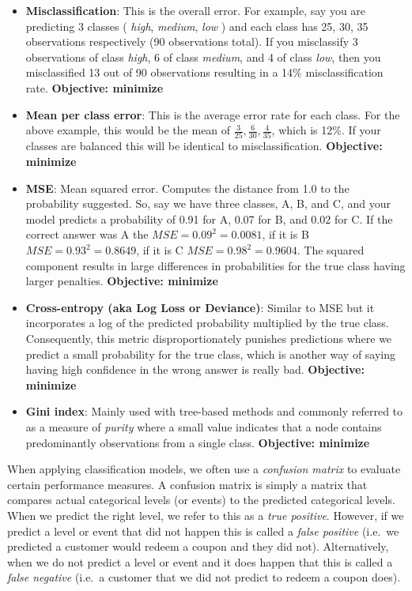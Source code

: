 \documentclass[]{krantz}
\begin{document}
\begin{itemize}
\item
  \textbf{Misclassification}: This is the overall error. For example, say you are predicting 3 classes ( \emph{high}, \emph{medium}, \emph{low} ) and each class has 25, 30, 35 observations respectively (90 observations total). If you misclassify 3 observations of class \emph{high}, 6 of class \emph{medium}, and 4 of class \emph{low}, then you misclassified 13 out of 90 observations resulting in a 14\% misclassification rate. \textbf{Objective: minimize}
\item
  \textbf{Mean per class error}: This is the average error rate for each class. For the above example, this would be the mean of \(\frac{3}{25}, \frac{6}{30}, \frac{4}{35}\), which is 12\%. If your classes are balanced this will be identical to misclassification. \textbf{Objective: minimize}
\item
  \textbf{MSE}: Mean squared error. Computes the distance from 1.0 to the probability suggested. So, say we have three classes, A, B, and C, and your model predicts a probability of 0.91 for A, 0.07 for B, and 0.02 for C. If the correct answer was A the \(MSE = 0.09^2 = 0.0081\), if it is B \(MSE = 0.93^2 = 0.8649\), if it is C \(MSE = 0.98^2 = 0.9604\). The squared component results in large differences in probabilities for the true class having larger penalties. \textbf{Objective: minimize}
\item
  \textbf{Cross-entropy (aka Log Loss or Deviance)}: Similar to MSE but it incorporates a log of the predicted probability multiplied by the true class. Consequently, this metric disproportionately punishes predictions where we predict a small probability for the true class, which is another way of saying having high confidence in the wrong answer is really bad. \textbf{Objective: minimize}
\item
  \textbf{Gini index}: Mainly used with tree-based methods and commonly referred to as a measure of \emph{purity} where a small value indicates that a node contains predominantly observations from a single class. \textbf{Objective: minimize}
\end{itemize}

When applying classification models, we often use a \emph{confusion matrix} to evaluate certain performance measures. A confusion matrix is simply a matrix that compares actual categorical levels (or events) to the predicted categorical levels. When we predict the right level, we refer to this as a \emph{true positive}. However, if we predict a level or event that did not happen this is called a \emph{false positive} (i.e.~we predicted a customer would redeem a coupon and they did not). Alternatively, when we do not predict a level or event and it does happen that this is called a \emph{false negative} (i.e.~a customer that we did not predict to redeem a coupon does).
\end{document}
